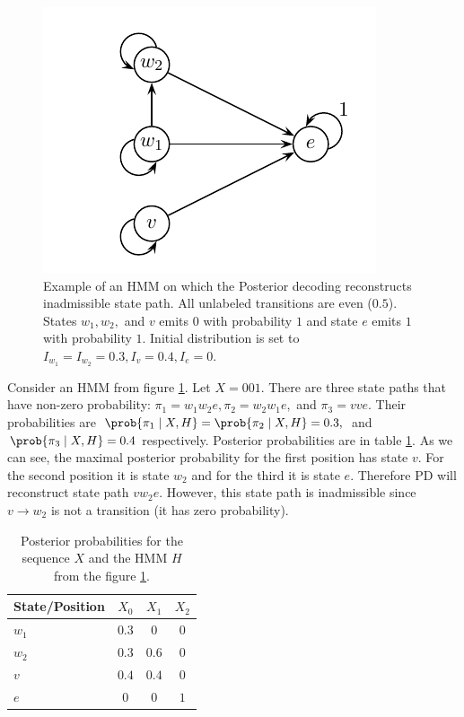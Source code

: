 \begin{figure}
\begin{center}
\includegraphics{../figures/posteriorInadmissibleStatePath.pdf}
\end{center}
\caption[Hidden Markov Model on which posterior decoding reconstructs
inadmissible state path]{
Example of an HMM on which the Posterior decoding reconstructs inadmissible state path. 
All unlabeled transitions are even ($0.5$). States $w_1,w_2,$ and $v$ emits $0$
with probability $1$ and state $e$ emits $1$ with probability $1$.
Initial distribution is set to $I_{w_1}=I_{w_2}=0.3, I_{v}=0.4, I_{e}=0$.
}\label{FIGURE:INADMISSIBLESTATEPATH}
\end{figure}

\begin{example}
Consider an HMM from figure \ref{FIGURE:INADMISSIBLESTATEPATH}. Let $X=001$. There
are three state paths that have non-zero probability:
$\pi_1=w_1w_2e,\pi_2=w_2w_1e,$ and $\pi_3=vve$. Their probabilities are
$\prob{\pi_1\mid X,H}=\prob{\pi_2\mid X,H}=0.3,$ and $\prob{\pi_3\mid X,H}=0.4$
respectively.
Posterior probabilities are in table \ref{TABLE:INADMISSIBLESTATEPATH}.
As we can see, the maximal posterior probability for the first position has state
$v$. For the second position it is state $w_2$ and for the third it is state
$e$. Therefore PD will reconstruct state path $vw_2e$. However, this state path 
is inadmissible since  $v\to w_2$ is not a transition (it has zero probability).

\begin{table}
\begin{center}
\begin{tabular}{|l|c|c|c|}
\hline
State/Position & $X_0$ & $X_1$ & $X_2$ \\\hline
$w_1$ & $0.3$ & $0$ & $0$ \\\hline
$w_2$ & $0.3$ & $0.6$ & $0$ \\\hline
$v$   & $0.4$ & $0.4$ & $0$\\\hline
$e$  & $0$ & $0$ & $1$ \\\hline
\end{tabular}
\end{center}
\caption[Example of posterior probabilities.]{Posterior probabilities for
the sequence $X$ and the HMM $H$ from the figure \ref{FIGURE:INADMISSIBLESTATEPATH}.
}\label{TABLE:INADMISSIBLESTATEPATH}
\end{table}

\end{example}

